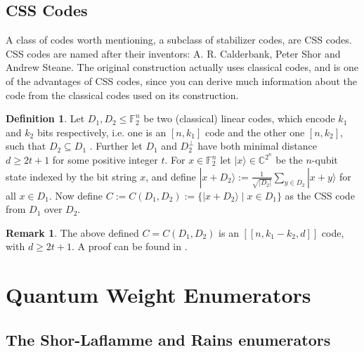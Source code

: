 \documentclass{article}
\def\F{\mathbb{F}}
\def\C{\mathbb{C}}
\theoremstyle{definition}
\newtheorem{rem}[Satz]{Remark}
\newtheorem{defn}[Satz]{Definition}
\begin{document}
\subsection{CSS Codes}

A class of codes worth mentioning, a subclass of stabilizer codes, are CSS codes. CSS codes are named after their inventors: A. R. Calderbank, Peter Shor and Andrew Steane.
The original construction actually uses classical codes, and is one of the advantages of CSS codes, since you can derive much information about the code from the classical codes used on its construction. 

\begin{defn}

  Let $D_1, D_2 \leq \F_{2}^n $ be two (classical) linear codes, which encode $k_1$ and $k_2$ bits respectively, i.e. one is an  $[n,k_1]$ code and the other one $[n,k_2]$, such that $D_2 \subseteq D_1$ . Further let $D_1$ and $D_2^{\perp}$ have both minimal distance $d \geq 2t+1$ for some positive integer $t$.
  For $ x \in \F_{2}^n$ let $ |x \rangle \in \C^{2^n}$ be the $n$-qubit state indexed by the bit string $x$, and define $ | x + D_2 \rangle := \frac{1}{\sqrt{|D_2|}} \sum_{y \in D_2} | x + y \rangle$ for all $x \in D_1$.
  Now define $C := C (D_1,D_2) := \{ | x + D_2 \rangle \mid x \in D_1 \}$ as the CSS code from $D_1$ over $D_2$. 
\end{defn}

\begin{rem}
  The above defined $C = C(D_1,D_2)$ is an $[[n,k_1 - k_2,d]]$ code, with $d \geq 2t+1$. A proof can be found in \cite{NC}.
 \end{rem}

\clearpage \newpage
\section{Quantum Weight Enumerators}

\subsection{The Shor-Laflamme and Rains enumerators}
\end{document}
